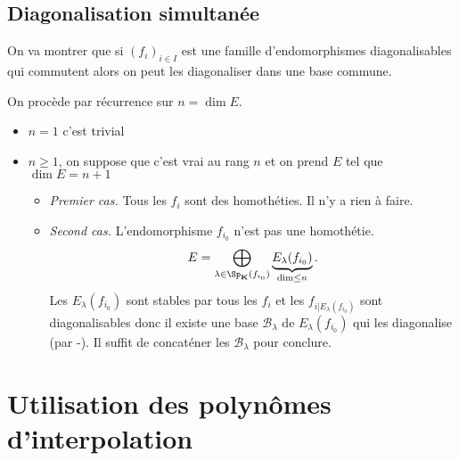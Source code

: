 \subsection{Diagonalisation simultanée}

On va montrer que si $(f_i)_{i\in I}$ est une famille d'endomorphismes diagonalisables qui commutent alors on peut les diagonaliser dans une base commune.

On procède par récurrence sur $n=\dim E$.
\begin{itemize}
    \item $n=1$ c'est trivial
    \item $n\geq 1$, on suppose que c'est vrai au rang $n$ et on prend $E$ tel que $\dim E=n+1$ \begin{itemize}
        \item \emph{Premier cas.} Tous les $f_i$ sont des homothéties. Il n'y a rien à faire.
        \item \emph{Second cas.} L'endomorphisme $f_{i_0}$ n'est pas une homothétie. \[
                E=\bigoplus_{\lambda\in\Sp_{\K}(f_{i_0})} \underbrace{E_\lambda(f_{i_0})}_{\dim \leq n}.
            \]
            Les $E_\lambda(f_{i_0})$ sont stables par tous les $f_i$ et les $f_{i|E_\lambda(f_{i_0})}$ sont diagonalisables donc il existe une base $\mathcal B_\lambda$ de $E_\lambda(f_{i_0})$ qui les diagonalise (par \hyp). Il suffit de concaténer les $\mathcal B_\lambda$ pour conclure.
    \end{itemize}
\end{itemize}

\section{Utilisation des polynômes d'interpolation}

